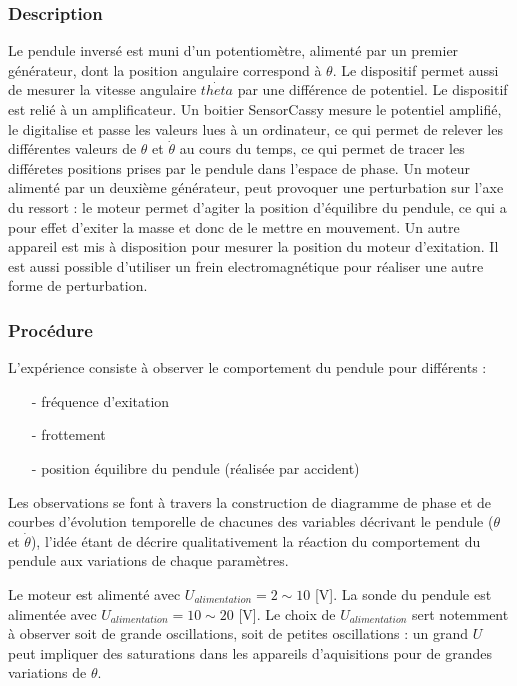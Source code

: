 \documentclass[a4paper,12pt,oneside]{article}
\begin{document}
\subsubsection{Description}

Le pendule inversé est muni d'un potentiomètre, alimenté par un premier générateur, dont la position angulaire correspond à $\theta$. Le dispositif permet aussi de mesurer la vitesse angulaire $\dot{theta}$ par une différence de potentiel. Le dispositif est relié à un amplificateur.
Un boitier SensorCassy mesure le potentiel amplifié, le digitalise et passe les valeurs lues à un ordinateur, ce qui permet de relever les différentes valeurs de $\theta$ et $\dot{\theta}$ au cours du temps, ce qui permet de tracer les différetes positions prises par le pendule dans l'espace de phase.
Un moteur alimenté par un deuxième générateur, peut provoquer une perturbation sur l'axe du ressort : le moteur permet d'agiter la position d'équilibre du pendule, ce qui a pour effet d'exiter la masse et donc de le mettre en mouvement. Un autre appareil est mis à disposition pour mesurer la position du moteur d'exitation.
Il est aussi possible d'utiliser un frein electromagnétique pour réaliser une autre forme de perturbation.

\subsubsection{Procédure}

L'expérience consiste à observer le comportement du pendule pour différents :
\begin{itemize}
  \item[-] fréquence d'exitation
  \item[-] frottement
  \item[-] position équilibre du pendule (réalisée par accident)
\end{itemize}

Les observations se font à travers la construction de diagramme de phase et de courbes d'évolution temporelle de chacunes des variables décrivant le pendule ($\theta$ et $\dot{\theta}$), l'idée étant de décrire qualitativement la réaction du comportement du pendule aux variations de chaque paramètres.


Le moteur est alimenté avec $U_{alimentation}=2\sim10$ [V].
La sonde du pendule est alimentée avec $U_{alimentation}=10\sim20$ [V]. Le choix de $U_{alimentation}$ sert notemment à observer soit de grande oscillations, soit de petites oscillations : un grand $U$ peut impliquer des saturations dans les appareils d'aquisitions pour de grandes variations de $\theta$.
\end{document}
